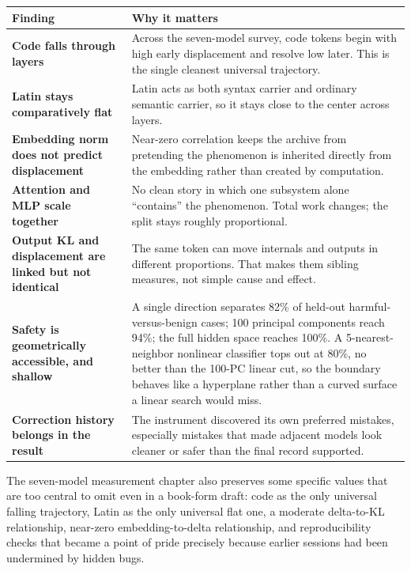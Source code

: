 \documentclass[11pt,oneside]{book}
\begin{document}
\begin{center}
\begin{tabularx}{\textwidth}{>{\bfseries}p{}Y}
\toprule
Finding & Why it matters \\
\midrule
Code falls through layers & Across the seven-model survey, code tokens begin with high early displacement and resolve low later. This is the single cleanest universal trajectory. \\
Latin stays comparatively flat & Latin acts as both syntax carrier and ordinary semantic carrier, so it stays close to the center across layers. \\
Embedding norm does not predict displacement & Near-zero correlation keeps the archive from pretending the phenomenon is inherited directly from the embedding rather than created by computation. \\
Attention and MLP scale together & No clean story in which one subsystem alone ``contains'' the phenomenon. Total work changes; the split stays roughly proportional. \\
Output KL and displacement are linked but not identical & The same token can move internals and outputs in different proportions. That makes them sibling measures, not simple cause and effect. \\
Safety is geometrically accessible, and shallow & A single direction separates 82\% of held-out harmful-versus-benign cases; 100 principal components reach 94\%; the full hidden space reaches 100\%. A 5-nearest-neighbor nonlinear classifier tops out at 80\%, no better than the 100-PC linear cut, so the boundary behaves like a hyperplane rather than a curved surface a linear search would miss. \\
Correction history belongs in the result & The instrument discovered its own preferred mistakes, especially mistakes that made adjacent models look cleaner or safer than the final record supported. \\
\bottomrule
\end{tabularx}
\end{center}

The seven-model measurement chapter also preserves some specific values that are too central to omit even in a book-form draft: code as the only universal falling trajectory, Latin as the only universal flat one, a moderate delta-to-KL relationship, near-zero embedding-to-delta relationship, and reproducibility checks that became a point of pride precisely because earlier sessions had been undermined by hidden bugs.
\end{document}
